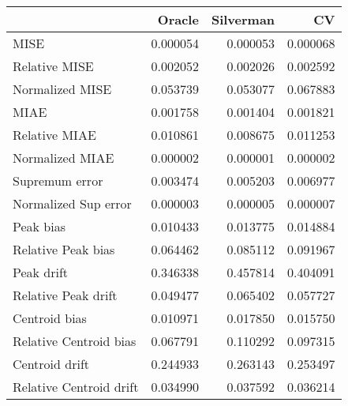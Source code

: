 \begin{tabular}{lrrr}
  \toprule
 & Oracle & Silverman & CV \\ 
  \midrule
MISE & 0.000054 & 0.000053 & 0.000068 \\ 
  Relative MISE & 0.002052 & 0.002026 & 0.002592 \\ 
  Normalized MISE & 0.053739 & 0.053077 & 0.067883 \\ 
  MIAE & 0.001758 & 0.001404 & 0.001821 \\ 
  Relative MIAE & 0.010861 & 0.008675 & 0.011253 \\ 
  Normalized MIAE & 0.000002 & 0.000001 & 0.000002 \\ 
  Supremum error & 0.003474 & 0.005203 & 0.006977 \\ 
  Normalized Sup error & 0.000003 & 0.000005 & 0.000007 \\ 
  Peak bias & 0.010433 & 0.013775 & 0.014884 \\ 
  Relative Peak bias & 0.064462 & 0.085112 & 0.091967 \\ 
  Peak drift & 0.346338 & 0.457814 & 0.404091 \\ 
  Relative Peak drift & 0.049477 & 0.065402 & 0.057727 \\ 
  Centroid bias & 0.010971 & 0.017850 & 0.015750 \\ 
  Relative Centroid bias & 0.067791 & 0.110292 & 0.097315 \\ 
  Centroid drift & 0.244933 & 0.263143 & 0.253497 \\ 
  Relative Centroid drift & 0.034990 & 0.037592 & 0.036214 \\ 
   \bottomrule
\end{tabular}
